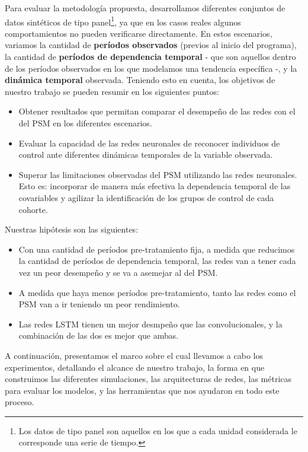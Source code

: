 \documentclass[../main.tex]{subfiles}
\begin{document}
Para evaluar la metodología propuesta, desarrollamos diferentes conjuntos de datos
sintéticos de tipo panel\footnote{Los datos de tipo panel son aquellos en los que a cada
unidad considerada le corresponde una serie de tiempo.}, ya que en los casos reales
algunos comportamientos no pueden verificarse directamente. En estos escenarios, variamos
la cantidad de \textbf{períodos observados} (previos al inicio del programa), la cantidad
de \textbf{períodos de dependencia temporal} - que son aquellos dentro de los períodos
observados en los que modelamos una tendencia específica -, y la \textbf{dinámica
temporal} observada. Teniendo esto en cuenta, los objetivos de nuestro trabajo se pueden
resumir en los siguientes puntos:
\begin{itemize}
    \item Obtener resultados que permitan comparar el desempeño de las redes con
    el del PSM en los diferentes escenarios.
    \item Evaluar la capacidad de las redes neuronales de reconocer individuos de control
    ante diferentes dinámicas temporales de la variable observada.
    \item Superar las limitaciones observadas del PSM utilizando las redes neuronales.
    Esto es: incorporar de manera más efectiva la dependencia temporal de las covariables
    y agilizar la identificación de los grupos de control de cada cohorte.
\end{itemize}

Nuestras hipótesis son las siguientes:
\begin{itemize}
    \item Con una cantidad de períodos pre-tratamiento fija, a medida que reducimos
    la cantidad de períodos de dependencia temporal, las redes van a tener cada
    vez un peor desempeño y se va a asemejar al del PSM.
    \item A medida que haya menos períodos pre-tratamiento, tanto las redes como el
    PSM van a ir teniendo un peor rendimiento.
    \item Las redes LSTM tienen un mejor desmpeño que las convolucionales, y la combinación
    de las dos es mejor que ambas.
\end{itemize}

A continuación, presentamos el marco sobre el cual llevamos a cabo los experimentos,
detallando el alcance de nuestro trabajo, la forma en que construimos las diferentes
simulaciones, las arquitecturas de redes, las métricas para evaluar los modelos,
y las herramientas que nos ayudaron en todo este proceso.
\end{document}
